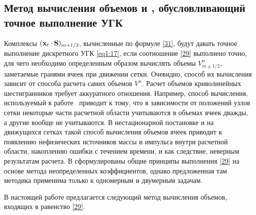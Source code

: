 \subsection{Метод вычисления объемов  и ,
            обусловливающий точное выполнение УГК}
\label{s:124}
Комплексы $({\bf{x}}_t  \cdot {\bf{S}})_{m + 1/2}$, вычисленные по формуле \eqref{31}, будут давать точное 
выполнение дискретного УГК \eqref{eq1:17}, если соотношение \eqref{29} выполнено точно, для чего необходимо 
определенным образом вычислять объемы $V^n_{m\pm 1/2}$, заметаемые гранями ячеек при движении сетки. 
Очевидно, способ их вычисления зависит от способа расчета самих объемов $V^n$. Расчет объемов криволинейных 
шестигранников требует аккуратного отношения. Например, способ вычисления, используемый 
в работе~\cite{RizziErikson} приводит к тому, что в зависимости от положений узлов сетки некоторые части 
расчетной области учитываются в объемах ячеек дважды, а другие вообще не учитываются. В нестационарной 
постановке и на движущихся сетках такой способ вычисления объемов ячеек приводит к появлению нефизических  
источников массы и импульса внутри расчетной области, накоплению ошибки с течением времени, и как следствие, 
неверным результатам расчета. В \cite{volkov} сформулированы общие принципы выполнения \eqref{29} 
на основе метода неопределенных коэффициентов, однако предложенная там методика применима только к одномерным 
и двумерным задачам.

В настоящей работе предлагается следующий метод вычисления объемов, входящих в равенство \eqref{29}.

